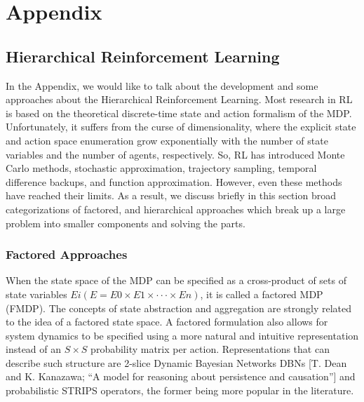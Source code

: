 \documentclass[11pt]{article}
\begin{document}
\newpage
\section{Appendix}

\subsection{Hierarchical Reinforcement Learning}

In the Appendix, we would like to talk about the development and some approaches about the Hierarchical Reinforcement Learning. Most research in RL is based on the theoretical discrete-time state and action formalism of the MDP. Unfortunately, it suffers from the curse of dimensionality, where the explicit state and action space enumeration grow exponentially with the number of state variables and the number of agents, respectively. So, RL has introduced Monte Carlo methods, stochastic approximation, trajectory sampling, temporal difference backups, and function approximation. However, even these methods have reached their limits. As a result, we discuss briefly in this section broad categorizations of factored, and hierarchical approaches which break up a large problem into smaller components and solving the parts.

\subsubsection{Factored Approaches}

When the state space of the MDP can be specified as a cross-product of sets of state variables
$Ei (E = E0 × E1 × ··· × En)$, it is called a factored MDP (FMDP). The concepts of state abstraction and aggregation are strongly related to the idea of a factored state space. A factored formulation also allows for system dynamics to be specified using a more natural and intuitive representation instead of an $S×S$ probability matrix per action. Representations that can describe such structure are 2-slice Dynamic Bayesian Networks DBNs [T. Dean and K. Kanazawa; “A model for reasoning about persistence and causation”] and probabilistic STRIPS operators, the former being more popular in the literature.
\end{document}
